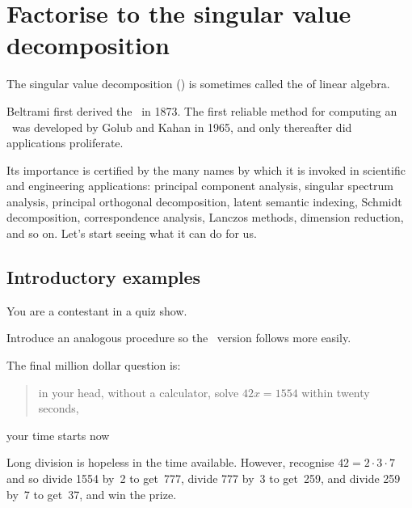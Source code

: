 

\section{Factorise to the singular value decomposition}
\label{sec:fisvd}
\secttoc

\begin{comment}
\pooliv{\S7.4} \holti{\S8.4} \cite[\S06]{Davis99a} \cite[\S8.7]{Nakos1998}
In a sense, the \svd\ replaces the \(\tr PLU\) factorisation of classic linear algebra, e.g.\ \pooliv{\S3.4}.
The computation of an \svd\ is well conditioned, unlike \textsc{lu} decomposition and eigenvalue calculations which are commonly poorly conditioned.
\end{comment}


The singular value decomposition (\svd) is sometimes called the  of  linear algebra.
\begin{aside}
Beltrami first derived the \svd\ in 1873.  
The first reliable method for computing an \svd\ was developed by Golub and Kahan in 1965, and only thereafter did applications proliferate.
\end{aside}
Its importance is certified by the many names by which it is invoked in scientific and engineering applications: principal component analysis, singular spectrum analysis, principal orthogonal decomposition, latent semantic indexing, Schmidt decomposition, correspondence analysis, Lanczos methods, dimension reduction, and so on.
Let's start seeing what it can do for us.




\subsection{Introductory examples}
\label{sec:svdeg}

You are a contestant in a quiz show.
\begin{aside}
Introduce an analogous procedure so the \svd\ version follows more easily.
\end{aside}
The final million dollar question is: 
\begin{quote}
in your head, without a calculator, solve \(42x=1554\) within twenty seconds,
\end{quote} 
your time starts now\dotfill
\begin{solution} 
Long division is hopeless in the time available.  
However, recognise \(42=2\cdot3\cdot7\) and so divide 1554 by~2 to get~777, divide 777 by~3 to get~259, and divide 259 by~7 to get~37, and win the prize.
\end{solution}

